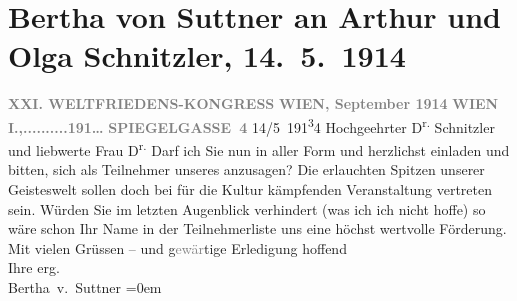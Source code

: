 

         
         \renewcommand{\erwaehntePersonen}{Personen: Olga Schnitzler, Bertha von Suttner}
         \renewcommand{\erwaehnteOrte}{Orte: I., Innere Stadt, Spiegelgasse, Wien}
         \renewcommand{\erwaehnteWerke}{}
               \section[Bertha von Suttner an Arthur und Olga Schnitzler, 14. 5. 1914]{ Bertha von Suttner an Arthur und Olga Schnitzler, 14. 5. 1914}\nopagebreak{}\rehead{ }\begin{ledgroupsized}[t]{13cm}\normalsize\beginnumbering \toendnotes[C]{\smallbreak\pagebreak[2]} 
\toendnotes[C]{\smallbreak}\pstart
           \noindent{}\centering{}{\pb}\textcolor{gray}{\textbf{XXI. WELTFRIEDENS-KONGRESS}}\pend
           \pstart
           \noindent{}\centering{}\textcolor{gray}{\textbf{WIEN, September 1914}}\pend
           \pstart
           \noindent{}\raggedleft{}\textcolor{gray}{\textbf{WIEN I.,..........191{\dots}}}\pend
           \pstart
           \noindent{}\raggedleft{}\textcolor{gray}{\textbf{SPIEGELGASSE 4}}\pend
           \pstart
           \raggedleft{}14/5 191\substVorne{}\textsuperscript{3}\substDazwischen{}4\substHinten{}\pend
           \pstart{}Hochgeehrter D\textsuperscript{r.} Schnitzler und liebwerte Frau
                     D\textsuperscript{r.}\pend\pstart
           Darf ich Sie nun in aller Form und herzlichst einladen und bitten, sich als
               Teilnehmer unseres \label{K_L02179-1v}\label{K_L02179-1h} anzusagen? Die erlauchten
               Spitzen unserer Geisteswelt sollen doch bei für die Kultur kämpfenden Veranstaltung
               vertreten sein.\pend
           \pstart
           Würden Sie im letzten Augenblick verhindert (was ich ich nicht hoffe) so wäre schon
               Ihr Name in der Teilnehmerliste uns eine höchst wertvolle Förderung.\pend
           \pstart
           Mit vielen Grüssen – und g\textcolor{gray}{ewär}tige Erledigung
               hoffend{\\[\baselineskip]}Ihre erg.{\\[\baselineskip]}\spacefill\mbox{Bertha v. Suttner}\pend
           \leftskip=0em{}
         

\end{ledgroupsized}
